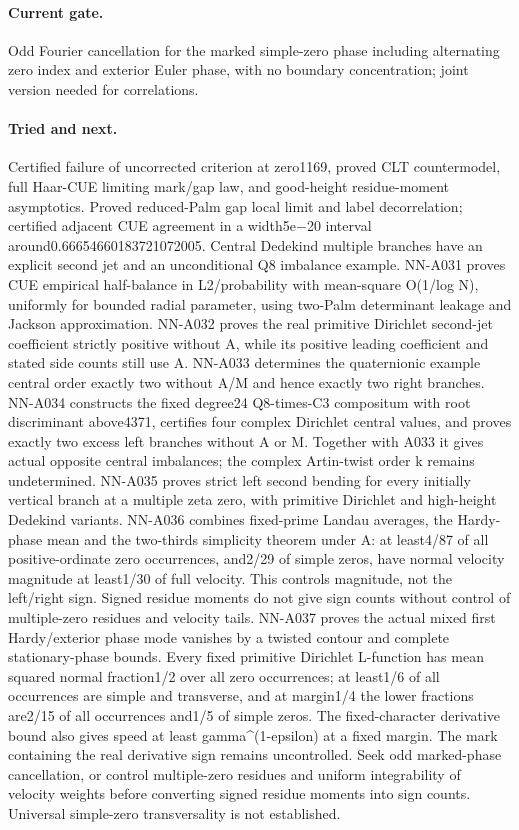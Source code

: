 \paragraph{Current gate.} Odd Fourier cancellation for the marked simple-zero phase including alternating zero index and exterior Euler phase, with no boundary concentration; joint version needed for correlations.
\paragraph{Tried and next.} Certified failure of uncorrected criterion at zero1169, proved CLT countermodel, full Haar-CUE limiting mark/gap law, and good-height residue-moment asymptotics. Proved reduced-Palm gap local limit and label decorrelation; certified adjacent CUE agreement in a width5e−20 interval around0.66654660183721072005. Central Dedekind multiple branches have an explicit second jet and an unconditional Q8 imbalance example. NN-A031 proves CUE empirical half-balance in L2/probability with mean-square O(1/log N), uniformly for bounded radial parameter, using two-Palm determinant leakage and Jackson approximation. NN-A032 proves the real primitive Dirichlet second-jet coefficient strictly positive without A, while its positive leading coefficient and stated side counts still use A. NN-A033 determines the quaternionic example central order exactly two without A/M and hence exactly two right branches. NN-A034 constructs the fixed degree24 Q8-times-C3 compositum with root discriminant above4371, certifies four complex Dirichlet central values, and proves exactly two excess left branches without A or M. Together with A033 it gives actual opposite central imbalances; the complex Artin-twist order k remains undetermined. NN-A035 proves strict left second bending for every initially vertical branch at a multiple zeta zero, with primitive Dirichlet and high-height Dedekind variants. NN-A036 combines fixed-prime Landau averages, the Hardy-phase mean and the two-thirds simplicity theorem under A: at least4/87 of all positive-ordinate zero occurrences, and2/29 of simple zeros, have normal velocity magnitude at least1/30 of full velocity. This controls magnitude, not the left/right sign. Signed residue moments do not give sign counts without control of multiple-zero residues and velocity tails. NN-A037 proves the actual mixed first Hardy/exterior phase mode vanishes by a twisted contour and complete stationary-phase bounds. Every fixed primitive Dirichlet L-function has mean squared normal fraction1/2 over all zero occurrences; at least1/6 of all occurrences are simple and transverse, and at margin1/4 the lower fractions are2/15 of all occurrences and1/5 of simple zeros. The fixed-character derivative bound also gives speed at least gamma\textasciicircum{}(1-epsilon) at a fixed margin. The mark containing the real derivative sign remains uncontrolled. Seek odd marked-phase cancellation, or control multiple-zero residues and uniform integrability of velocity weights before converting signed residue moments into sign counts. Universal simple-zero transversality is not established.

